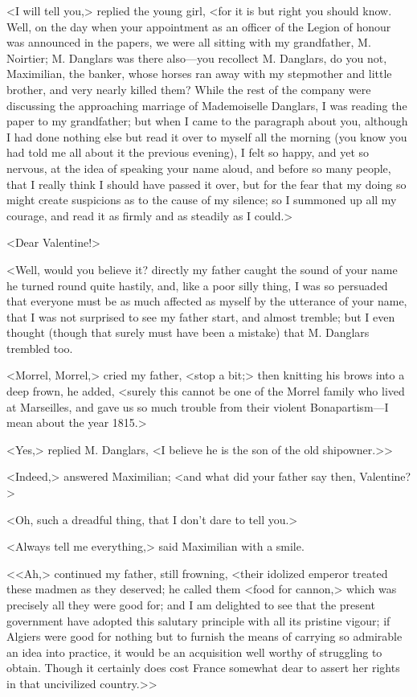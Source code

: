  <I will tell you,> replied the young girl, <for it is but right you should know. Well, on the day when your appointment as an officer of the Legion of honour was announced in the papers, we were all sitting with my grandfather, M. Noirtier; M. Danglars was there also—you recollect M. Danglars, do you not, Maximilian, the banker, whose horses ran away with my stepmother and little brother, and very nearly killed them? While the rest of the company were discussing the approaching marriage of Mademoiselle Danglars, I was reading the paper to my grandfather; but when I came to the paragraph about you, although I had done nothing else but read it over to myself all the morning (you know you had told me all about it the previous evening), I felt so happy, and yet so nervous, at the idea of speaking your name aloud, and before so many people, that I really think I should have passed it over, but for the fear that my doing so might create suspicions as to the cause of my silence; so I summoned up all my courage, and read it as firmly and as steadily as I could.>  
 
 <Dear Valentine!> 

<Well, would you believe it? directly my father caught the sound of your name he turned round quite hastily, and, like a poor silly thing, I was so persuaded that everyone must be as much affected as myself by the utterance of your name, that I was not surprised to see my father start, and almost tremble; but I even thought (though that surely must have been a mistake) that M. Danglars trembled too. 

<Morrel, Morrel,> cried my father, <stop a bit;> then knitting his brows into a deep frown, he added, <surely this cannot be one of the Morrel family who lived at Marseilles, and gave us so much trouble from their violent Bonapartism—I mean about the year 1815.> 

<Yes,> replied M. Danglars, <I believe he is the son of the old shipowner.>>

 <Indeed,> answered Maximilian; <and what did your father say then, Valentine?> 

 <Oh, such a dreadful thing, that I don't dare to tell you.> 

 <Always tell me everything,> said Maximilian with a smile. 

<<Ah,> continued my father, still frowning, <their idolized emperor treated these madmen as they deserved; he called them <food for cannon,> which was precisely all they were good for; and I am delighted to see that the present government have adopted this salutary principle with all its pristine vigour; if Algiers were good for nothing but to furnish the means of carrying so admirable an idea into practice, it would be an acquisition well worthy of struggling to obtain. Though it certainly does cost France somewhat dear to assert her rights in that uncivilized country.>>

